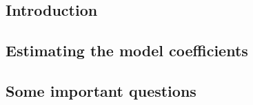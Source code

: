 \subsection{Introduction}


\subsection{Estimating the model coeﬃcients}


\subsection{Some important questions}


